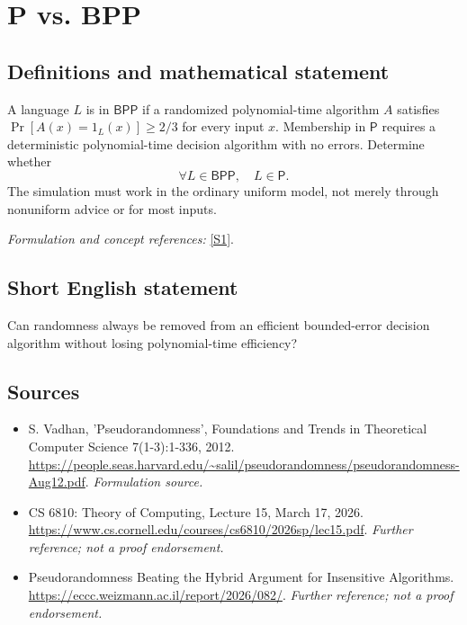\documentclass[11pt]{article}
\begin{document}
\section*{\texorpdfstring{P vs. BPP}{P vs. BPP}}\label{3405}
\subsection{Definitions and mathematical statement}
A language $L$ is in $\mathsf{BPP}$ if a randomized polynomial-time algorithm $A$ satisfies $\Pr[A(x)=1_L(x)]\ge2/3$ for every input $x$. Membership in $\mathsf P$ requires a deterministic polynomial-time decision algorithm with no errors. Determine whether
\[
 \forall L\in\mathsf{BPP},\quad L\in\mathsf P.
\]
The simulation must work in the ordinary uniform model, not merely through nonuniform advice or for most inputs.
\par\smallskip\textit{Formulation and concept references:} \href{https://people.seas.harvard.edu/~salil/pseudorandomness/pseudorandomness-Aug12.pdf}{[S1]}.

\subsection{Short English statement}
Can randomness always be removed from an efficient bounded-error decision algorithm without losing polynomial-time efficiency?
\subsection{Sources}
\begin{itemize}
\item[S1]S. Vadhan, 'Pseudorandomness', Foundations and Trends in Theoretical Computer Science 7(1-3):1-336, 2012.
\url{https://people.seas.harvard.edu/~salil/pseudorandomness/pseudorandomness-Aug12.pdf}.
\textit{Formulation source.}
\item[S2]CS 6810: Theory of Computing, Lecture 15, March 17, 2026.
\url{https://www.cs.cornell.edu/courses/cs6810/2026sp/lec15.pdf}.
\textit{Further reference; not a proof endorsement.}
\item[S3]Pseudorandomness Beating the Hybrid Argument for Insensitive Algorithms.
\url{https://eccc.weizmann.ac.il/report/2026/082/}.
\textit{Further reference; not a proof endorsement.}
\end{itemize}
\end{document}
